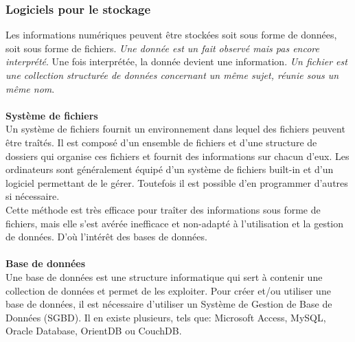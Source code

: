 \subsubsection{Logiciels pour le stockage\cite{systemDeFichiers}\cite{UitiliteDesBaseDeDonnees}}
	Les informations num\'eriques peuvent \^etre stock\'ees soit sous forme de donn\'ees, soit sous forme de fichiers. \textit{Une donn\'ee est un fait observ\'e mais pas encore interpr\'et\'e}. Une fois interpr\'et\'ee, la donn\'ee devient une information. \textit{Un fichier est une collection structur\'ee de donn\'ees concernant un m\^eme sujet, r\'eunie sous un m\^eme nom}.



	\paragraph{} \textbf{Syst\`eme de fichiers}\\
	Un syst\`eme de fichiers fournit un environnement dans lequel des fichiers peuvent \^etre tra\^it\'es. Il est compos\'e d'un ensemble de fichiers et d'une structure de dossiers qui organise ces fichiers et fournit des informations sur chacun d'eux. Les ordinateurs sont g\'en\'eralement \'equip\'e d'un syst\`eme de fichiers built-in et d'un logiciel permettant de le g\'erer. Toutefois il est possible d'en programmer d'autres si n\'ecessaire.\\
	Cette m\'ethode est tr\`es efficace pour tra\^iter des informations sous forme de fichiers, mais elle s'est av\'er\'ee inefficace et non-adapt\'e \`a l'utilisation et la gestion de donn\'ees\cite{systemDeFichiers}. D'o\`u l'int\'er\^et des bases de donn\'ees\cite{DefinitionDeFichier2}.




	\paragraph{}\textbf{Base de donn\'ees}\\
	Une base de donn\'ees est une structure informatique qui sert \`a contenir une collection de donn\'ees et permet de les exploiter\cite{BaseDeDonnees}.
	Pour cr\'eer et/ou utiliser une base de donn\'ees, il est n\'ecessaire d'utiliser un Syst\`eme de Gestion de Base de Donn\'ees (SGBD). Il en existe plusieurs, tels que: Microsoft Access, MySQL, Oracle Database, OrientDB ou CouchDB.




